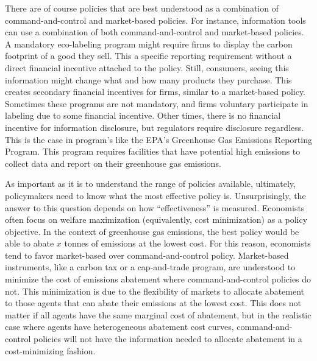 There are of course policies that are best understood as a combination of command-and-control and market-based policies. 
For instance, information tools can use a combination of both command-and-control and market-based policies. A mandatory eco-labeling program might require firms to display the carbon footprint of a good they sell. This a specific reporting requirement without a direct financial incentive attached to the policy. Still, consumers, seeing this information might change what and how many products they purchase. This creates secondary financial incentives for firms, similar to a market-based policy. Sometimes these programs are not mandatory, and firms  voluntary participate in labeling due to some financial incentive. Other times, there is no financial incentive for information disclosure, but regulators require disclosure regardless. This is the case in program's like the EPA's Greenhouse Gas Emissions Reporting Program. This program requires facilities that have potential high emissions to collect data and report on their greenhouse gas emissions.

As important as it is to understand the range of policies available, ultimately, policymakers need to know what the most effective policy is. Unsurprisingly, the answer to this question depends on how ``effectiveness'' is measured. Economists often focus on welfare maximization (equivalently, cost minimization) as a policy objective. In the context of greenhouse gas emissions, the best policy would be able to abate $x$ tonnes of emissions at the lowest cost. For this reason, economists tend to favor market-based over command-and-control policy. Market-based instruments, like a carbon tax or a cap-and-trade program, are understood to minimize the cost of emissions abatement where command-and-control policies do not. This minimization is due to the flexibility of markets to allocate abatement to those agents that can abate their emissions at the lowest cost. This does not matter if all agents have the same marginal cost of abatement, but in the realistic case where agents have heterogeneous abatement cost curves, command-and-control policies will not have the information needed to allocate abatement in a cost-minimizing fashion. 

